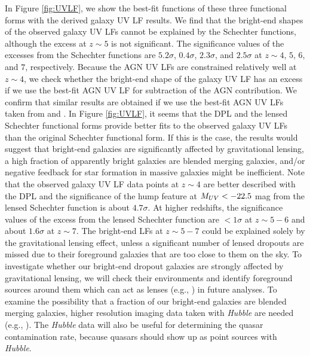 \documentclass[]{pasj01}
\begin{document}
In Figure \ref{fig:UVLF}, 
we show the best-fit functions of these three functional forms 
with the derived galaxy UV LF results. 
We find that 
the bright-end shapes of the observed galaxy UV LFs cannot be explained 
by the Schechter functions, 
although the excess at $z\sim5$ is not significant.  
The significance values of the excesses from the Schechter functions 
are 
$5.2 \sigma$, 
$0.4\sigma$, 
$2.3\sigma$, 
and 
$2.5\sigma$
at $z \sim 4$, $5$, $6$, and $7$, respectively. 
%
Because the AGN UV LFs are constrained relatively well at $z \sim 4$, 
we check whether the bright-end shape of the galaxy UV LF 
has an excess 
if we use the best-fit AGN UV LF for subtraction of 
the AGN contribution. 
We confirm that similar results are obtained if we use the best-fit AGN UV LFs 
taken from \citet{2017arXiv170405996A} and \citet{2011ApJ...728L..26G}. 
%
In Figure \ref{fig:UVLF}, 
it seems that 
the DPL and the lensed Schechter functional forms provide better fits to the observed galaxy UV LFs 
than the original Schechter functional form.  
If this is the case, 
the results would suggest that 
bright-end galaxies are significantly affected by gravitational lensing, 
a high fraction of apparently bright galaxies are blended merging galaxies, 
and/or 
negative feedback for star formation in massive galaxies might be inefficient. 
Note that 
the observed galaxy UV LF data points at $z \sim 4$ are better described with the DPL 
and the significance of the hump feature at $M_{\rm UV} < -22.5$ mag 
from the lensed Schechter function is about $4.7 \sigma$. 
At higher redshifts, 
the significance values of the excess from the lensed Schechter function 
are $< 1\sigma$ at $z \sim 5-6$ and about $1.6 \sigma$ at $z \sim 7$. 
The bright-end LFs at $z \sim 5-7$ could be explained solely by the gravitational lensing effect, 
%
unless a significant number of lensed dropouts are missed 
due to their foreground galaxies that are too close to them on the sky.
%
To investigate whether our bright-end dropout galaxies 
are strongly affected by gravitational lensing, 
we will check their environments and 
identify foreground sources around them which can act as lenses 
(e.g., \cite{2015MNRAS.450.1224B}) 
in future analyses.  
% 
To examine the possibility that 
a fraction of our bright-end galaxies are blended merging galaxies, 
higher resolution imaging data taken with \textit{Hubble} 
are needed 
(e.g., \cite{2017MNRAS.466.3612B}). 
%
The \textit{Hubble} data will also be useful 
for determining the quasar  contamination rate, 
because quasars should show up as point sources with \textit{Hubble}. 
\end{document}
